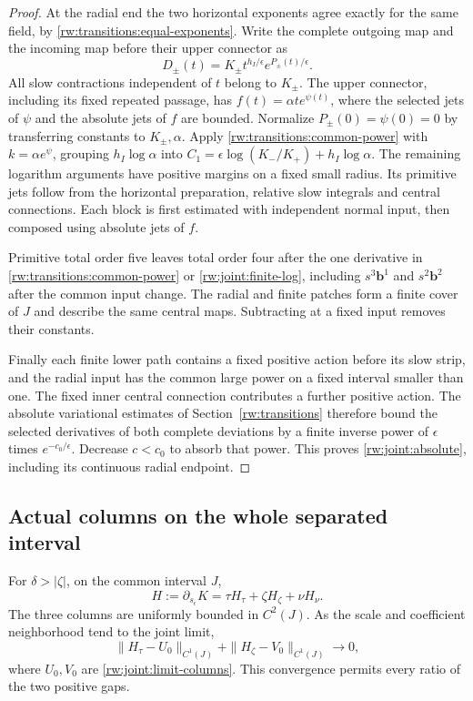 \begin{proof}
At the radial end the two horizontal exponents agree exactly for
the same field, by \eqref{rw:transitions:equal-exponents}.
Write the complete outgoing map and the incoming map before their
upper connector as
\[
 D_\pm(t)=K_\pm t^{h_I/\epsilon}
                         e^{P_\pm(t)/\epsilon}.
\]
All slow contractions independent of $t$ belong to $K_\pm$.
The upper connector, including its fixed repeated passage, has
$f(t)=\alpha t e^{\psi(t)}$, where the selected jets of $\psi$
and the absolute jets of $f$ are bounded. Normalize
$P_\pm(0)=\psi(0)=0$ by transferring constants to $K_\pm,\alpha$.
Apply \eqref{rw:transitions:common-power} with $k=\alpha e^\psi$,
grouping $h_I\log\alpha$ into
$C_1=\epsilon\log(K_-/K_+)+h_I\log\alpha$.
The remaining logarithm arguments have positive margins on a fixed
small radius. Its primitive jets follow from the horizontal preparation,
relative slow integrals and central connections. Each block is first
estimated with independent normal input, then composed using absolute
jets of $f$.

Primitive total order five leaves total order four after the one
derivative in \eqref{rw:transitions:common-power} or
\eqref{rw:joint:finite-log}, including $s^3\mathbf b^1$ and
$s^2\mathbf b^2$ after the common input change. The radial and finite
patches form a finite cover of $J$ and describe the same central maps.
Subtracting at a fixed input removes their constants.

Finally each finite lower path contains a fixed positive action
before its slow strip, and the radial input has the common large
power on a fixed interval smaller than one. The fixed inner central
connection contributes a further positive action. The absolute
variational estimates of Section~\ref{rw:transitions} therefore
bound the selected derivatives of both complete deviations by a
finite inverse power of $\epsilon$ times $e^{-c_0/\epsilon}$.
Decrease $c<c_0$ to absorb that power. This proves
\eqref{rw:joint:absolute}, including its continuous radial endpoint.
\end{proof}

\subsection{Actual columns on the whole separated interval}

\begin{proposition}\label{rw:joint:separated}
For $\delta>|\zeta|$, on the common interval $J$,
\begin{equation}\label{rw:joint:Hadamard}
 H:=\partial_{s_\epsilon}K
       =\tau H_\tau+\zeta H_\zeta+\nu H_\nu .
\end{equation}
The three columns are uniformly bounded in $C^2(J)$.
As the scale and coefficient neighborhood tend to the joint limit,
\[
 \|H_\tau-U_0\|_{C^1(J)}
       +\|H_\zeta-V_0\|_{C^1(J)}\longrightarrow0,
\]
where $U_0,V_0$ are \eqref{rw:joint:limit-columns}.
This convergence permits every ratio of the two positive gaps.
\end{proposition}

